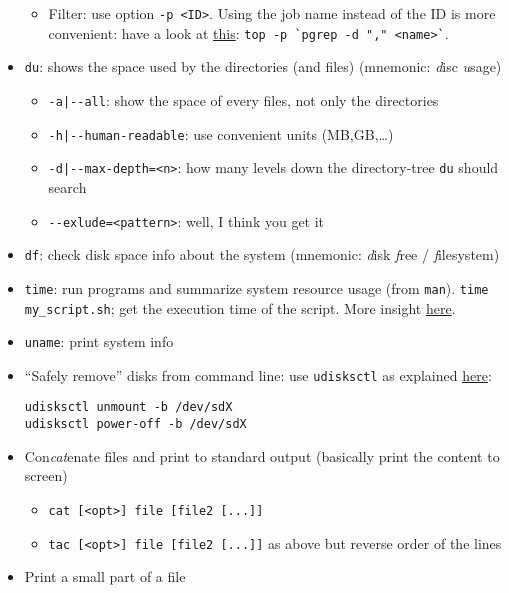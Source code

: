 \documentclass[a4paper,12pt,%
              final%
              ]{article}
\begin{document}
\begin{itemize}
\begin{itemize}
      \item Filter: use option \verb|-p <ID>|. Using the job name instead of the ID is more convenient: have a look at \href{https://unix.stackexchange.com/a/347544}{this}: \verb|top -p `pgrep -d "," <name>`|.
    \end{itemize}
  \item \texttt{du}: shows the space used by the directories (and files) (mnemonic: \emph{d}isc \emph{u}sage)
    \begin{itemize}
      \item \verb!-a|--all!: show the space of every files, not only the directories
      \item \verb!-h|--human-readable!: use convenient units (MB,GB,\ldots)
      \item \verb!-d|--max-depth=<n>!: how many levels down the directory-tree \texttt{du} should search
      \item \verb|--exlude=<pattern>|: well, I think you get it
    \end{itemize}
  \item \texttt{df}: check disk space info about the system (mnemonic: \emph{d}isk \emph{f}ree / \emph{f}ilesystem)
  \item \texttt{time}: run programs and summarize system resource usage (from \texttt{man}). \verb|time my_script.sh|; get the execution time of the script. More insight \href{https://stackoverflow.com/questions/556405/what-do-real-user-and-sys-mean-in-the-output-of-time1/556411#556411}{here}.
  \item \texttt{uname}: print system info
  \item ``Safely remove'' disks from command line: use \texttt{udisksctl} as explained \href{https://askubuntu.com/questions/532586/what-is-the-command-line-equivalent-of-safely-remove-drive}{here}:
\begin{verbatim}
udisksctl unmount -b /dev/sdX
udisksctl power-off -b /dev/sdX
\end{verbatim}
  \item Con\emph{cat}enate files and print to standard output (basically print the content to screen)
    \begin{itemize}
      \item \verb|cat [<opt>] file [file2 [...]]|
      \item \verb|tac [<opt>] file [file2 [...]]| as above but reverse order of the lines
    \end{itemize}
  \item Print a small part of a file

\end{itemize}
\end{document}
